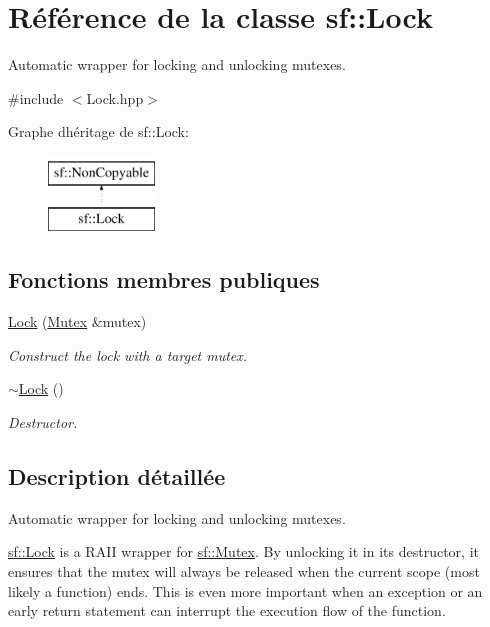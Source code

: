\hypertarget{classsf_1_1Lock}{}\section{Référence de la classe sf\+:\+:Lock}
\label{classsf_1_1Lock}


Automatic wrapper for locking and unlocking mutexes.  




{\ttfamily \#include $<$Lock.\+hpp$>$}

Graphe d\textquotesingle{}héritage de sf\+:\+:Lock\+:\begin{figure}[H]
\begin{center}
\leavevmode
\includegraphics[height=2.000000cm]{classsf_1_1Lock}
\end{center}
\end{figure}
\subsection*{Fonctions membres publiques}
\begin{DoxyCompactItemize}
\item 
\hyperlink{classsf_1_1Lock_a1a4c5d7a15da61103d85c9aa7f118920}{Lock} (\hyperlink{classsf_1_1Mutex}{Mutex} \&mutex)
\begin{DoxyCompactList}\small\item\em Construct the lock with a target mutex. \end{DoxyCompactList}\item 
\hyperlink{classsf_1_1Lock_a8168b36323a18ccf5b6bc531d964aec5}{$\sim$\+Lock} ()
\begin{DoxyCompactList}\small\item\em Destructor. \end{DoxyCompactList}\end{DoxyCompactItemize}


\subsection{Description détaillée}
Automatic wrapper for locking and unlocking mutexes. 

\hyperlink{classsf_1_1Lock}{sf\+::\+Lock} is a R\+A\+II wrapper for \hyperlink{classsf_1_1Mutex}{sf\+::\+Mutex}. By unlocking it in its destructor, it ensures that the mutex will always be released when the current scope (most likely a function) ends. This is even more important when an exception or an early return statement can interrupt the execution flow of the function.

